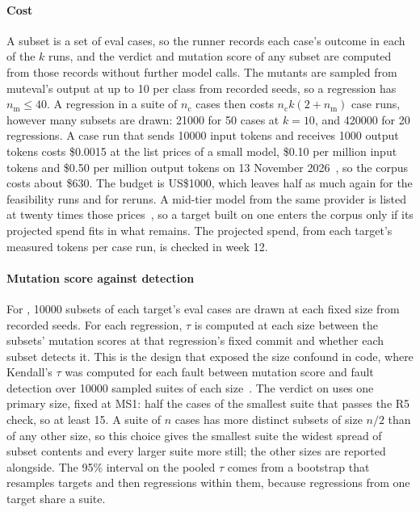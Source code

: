\documentclass[11pt]{article}
\begin{document}
\paragraph{Cost} A subset is a set of eval cases, so the runner records each case's outcome in each of the $k$ runs, and the verdict and mutation score of any subset are computed from those records without further model calls. The mutants are sampled from muteval's output at up to 10 per class from recorded seeds, so a regression has $n_{\mathrm{m}} \le 40$. A regression in a suite of $n_{\mathrm{c}}$ cases then costs $n_{\mathrm{c}} k (2 + n_{\mathrm{m}})$ case runs, however many subsets are drawn: \num{21000} for 50 cases at $k = 10$, and \num{420000} for 20 regressions. A case run that sends \num{10000} input tokens and receives 1000 output tokens costs \$0.0015 at the list prices of a small model, \$0.10 per million input tokens and \$0.50 per million output tokens on 13 November 2026~\cite{anthropicpricing}, so the corpus costs about \$630. The budget is US\$1000, which leaves half as much again for the feasibility runs and for reruns. A mid-tier model from the same provider is listed at twenty times those prices~\cite{anthropicpricing}, so a target built on one enters the corpus only if its projected spend fits in what remains. The projected spend, from each target's measured tokens per case run, is checked in week 12.

\paragraph{Mutation score against detection} For , \num{10000} subsets of each target's eval cases are drawn at each fixed size from recorded seeds. For each regression, $\tau$ is computed at each size between the subsets' mutation scores at that regression's fixed commit and whether each subset detects it. This is the design that exposed the size confound in code, where Kendall's $\tau$ was computed for each fault between mutation score and fault detection over \num{10000} sampled suites of each size~\cite{Papadakis2018}. The verdict on  uses one primary size, fixed at MS1: half the cases of the smallest suite that passes the R5 check, so at least 15. A suite of $n$ cases has more distinct subsets of size $n/2$ than of any other size, so this choice gives the smallest suite the widest spread of subset contents and every larger suite more still; the other sizes are reported alongside. The 95\% interval on the pooled $\tau$ comes from a bootstrap that resamples targets and then regressions within them, because regressions from one target share a suite.
\end{document}
